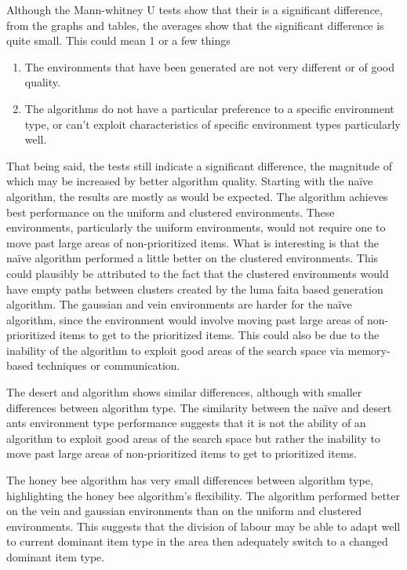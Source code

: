 Although the Mann-whitney U tests show that their is a significant difference, from the graphs and tables, the averages show that the significant difference is quite small. This could mean 1 or a few things
\begin{enumerate}
	\item The environments that have been generated are not very different or of good quality.
	\item The algorithms do not have a particular preference to a specific environment type, or can't exploit characteristics of specific environment types particularly well.
\end{enumerate}

That being said, the tests still indicate a significant difference, the magnitude of which may be increased by better algorithm quality. Starting with the na\"ive algorithm, the results are mostly as would be expected. The algorithm achieves best performance on the uniform and clustered environments. These environments, particularly the uniform environments, would not require one to move past large areas of non-prioritized items. What is interesting is that the na\"ive algorithm performed a little better on the clustered environments. This could plausibly be attributed to the fact that the clustered environments would have empty paths between clusters created by the luma faita based generation algorithm. The gaussian and vein environments are harder for the na\"ive algorithm, since the environment would involve moving past large areas of non-prioritized items to get to the prioritized items. This could also be due to the inability of the algorithm to exploit good areas of the search space via memory-based techniques or communication.

The desert and algorithm shows similar differences, although with smaller differences between algorithm type. The similarity between the na\"ive and desert ants environment type performance suggests that it is not the ability of an algorithm to exploit good areas of the search space but rather the inability to move past large areas of non-prioritized items to get to prioritized items.

The honey bee algorithm has very small differences between algorithm type, highlighting the honey bee algorithm's flexibility. The algorithm performed better on the vein and gaussian environments than on the uniform and clustered environments. This suggests that the division of labour may be able to adapt well to current dominant item type in the area then adequately switch to a changed dominant item type.

